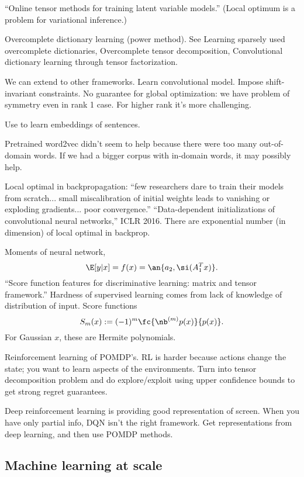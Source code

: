 ``Online tensor methods for training latent variable models.'' (Local optimum is  a problem for variational inference.)

Overcomplete dictionary learning (power method). See Learning sparsely used overcomplete dictionaries, Overcomplete tensor decomposition, Convolutional dictionary learning through tensor factorization.

We can extend to other frameworks. Learn convolutional model. Impose shift-invariant constraints. 
No guarantee for global optimization: we have problem of symmetry even in rank 1 case. 
For higher rank it's more challenging.

Use to learn embeddings of sentences. 

Pretrained word2vec didn't seem to help because there were too many out-of-domain words. If we had a bigger corpus with in-domain words, it may possibly help.


Local optimal in backpropagation: ``few researchers dare to train their models from scratch... small miscalibration of initial weights leads to vanishing or exploding gradients... poor convergence.'' ``Data-dependent initializations of convolutional neural networks,'' ICLR 2016.
There are exponential number (in dimension) of local optimal in backprop.

Moments of neural network, 
$$\E[y|x] = f(x) = \an{a_2 , \si(A_1^Tx)}.$$
``Score function features for discriminative learning: matrix and tensor framework.''
Hardness of supervised learning comes from lack of knowledge of distribution of input.
Score functions
$$
S_m(x) := (-1)^m \fc{\nb^{(m)}p(x)}{p(x)}.
$$
For Gaussian $x$, these are Hermite polynomials.

Reinforcement learning of POMDP's. RL is harder because actions change the state; you want to learn aspects of the environments. Turn into tensor decomposition problem and do explore/exploit using upper confidence bounds to get strong regret guarantees.

Deep reinforcement learning is providing good representation of screen. When you have only partial info, DQN isn't the right framework. Get representations from deep learning, and then use POMDP methods.

\subsection{Machine learning at scale}

